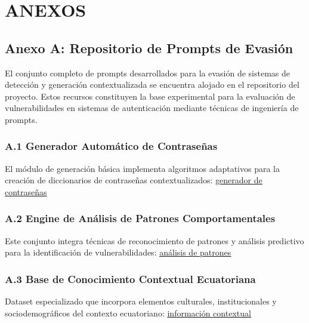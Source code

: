 
\hypersetup{
    colorlinks=true,
    linkcolor=blue,
    urlcolor=blue,
    citecolor=blue
}

\newcommand{\bluelink}[2]{\textcolor{blue}{\underline{\href{#1}{#2}}}}

\chapter*{ANEXOS}

\section*{Anexo A: Repositorio de Prompts de Evasión}

El conjunto completo de prompts desarrollados para la evasión de sistemas de detección y generación contextualizada se encuentra alojado en el repositorio del proyecto. Estos recursos constituyen la base experimental para la evaluación de vulnerabilidades en sistemas de autenticación mediante técnicas de ingeniería de prompts.

\subsection*{A.1 Generador Automático de Contraseñas}
El módulo de generación básica implementa algoritmos adaptativos para la creación de diccionarios de contraseñas contextualizados: \bluelink{https://github.com/MiguelPilamunga/DTic/blob/main/agenteAtaqueFuerzaBruta/prompts/genradoredecontrasenas.txt}{generador de contraseñas}

\subsection*{A.2 Engine de Análisis de Patrones Comportamentales}
Este conjunto integra técnicas de reconocimiento de patrones y análisis predictivo para la identificación de vulnerabilidades: \bluelink{https://github.com/MiguelPilamunga/DTic/blob/main/agenteAtaqueFuerzaBruta/prompts/prompts.txt}{análisis de patrones}

\subsection*{A.3 Base de Conocimiento Contextual Ecuatoriana}
Dataset especializado que incorpora elementos culturales, institucionales y sociodemográficos del contexto ecuatoriano: \bluelink{https://github.com/MiguelPilamunga/DTic/blob/main/agenteAtaqueFuerzaBruta/prompts/informacion.txt}{información contextual}

